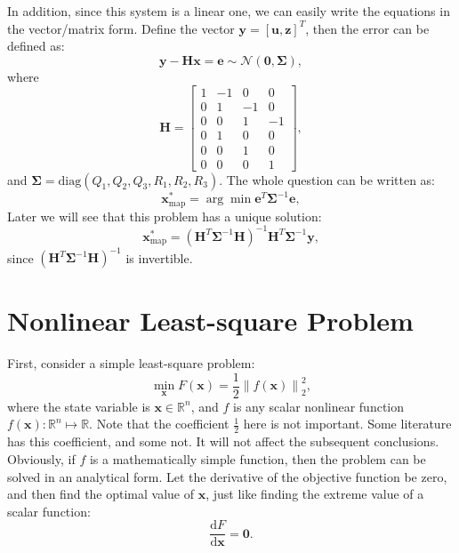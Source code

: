 In addition, since this system is a linear one, we can easily write the equations in the vector/matrix form. Define the vector $\mathbf{y}=[\mathbf{u}, \mathbf{z}]^T$, then the error can be defined as:
\begin{equation}
    \mathbf{y}-\mathbf{H}\mathbf{x} = \mathbf{e} \sim \mathcal{N}(\mathbf{0}, \boldsymbol{\Sigma}),
\end{equation}
where
\begin{equation}
    \mathbf{H} = \left[ {\begin{array}{*{20}{c}}
            1&{-1}&0&0\\
            0&1&{-1}&0\\
            0&0&1&{-1}\\
            \hline
            0&1&0&0\\
            0&0&1&0\\
            0&0&0&1
    \end{array}} \right],
\end{equation}
and $\boldsymbol{\Sigma}=\mathrm{diag}(Q_1, Q_2, Q_3, R_1, R_2, R_3)$. The whole question can be written as:
\begin{equation}
    \mathbf{x}^*_{\mathrm{map}} = \arg \min \mathbf{e}^T \boldsymbol{\Sigma}^{-1} \mathbf{e},
\end{equation}
Later we will see that this problem has a unique solution:
\begin{equation}
    \mathbf{x}^*_{\mathrm{map}} = (\mathbf{H}^T \boldsymbol{\Sigma}^{-1} \mathbf{H})^{-1} \mathbf{H}^T \boldsymbol{\Sigma}^{-1} \mathbf{y},
\end{equation}
since $(\mathbf{H}^T \boldsymbol{\Sigma}^{-1} \mathbf{H})^{-1}$ is invertible.

\section{Nonlinear Least-square Problem}
\label{sec:6.2}
First, consider a simple least-square problem:
\begin{equation}
    \mathop {\min }\limits_{\mathbf{x}} F(\mathbf{x}) = \frac{1}{2}{\left\| {f\left( \mathbf{x} \right) } \right\|^2_2},
\end{equation}
where the state variable is $\mathbf{x} \in \mathbb{R}^n$, and $f$ is any scalar nonlinear function $f(\mathbf{x}): \mathbb{R}^n \mapsto \mathbb{R}$. Note that the coefficient $\frac{1}{2}$ here is not important. Some literature has this coefficient, and some not. It will not affect the subsequent conclusions. Obviously, if $f$ is a mathematically simple function, then the problem can be solved in an analytical form. Let the derivative of the objective function be zero, and then find the optimal value of $\mathbf{x}$, just like finding the extreme value of a scalar function:
\begin{equation}
    \frac{ \mathrm{d} F}{ \mathrm{d} \mathbf{x}} = \mathbf{0}.
\end{equation}

